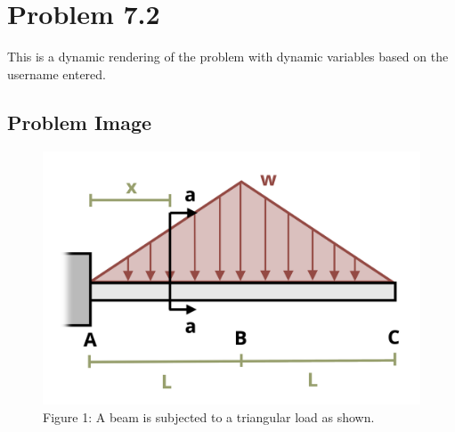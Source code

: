\documentclass[
  letterpaper,
  DIV=11,
  numbers=noendperiod]{scrreprt}
\begin{document}
\chapter*{Problem 7.2}\label{problem-7.2}


This is a dynamic rendering of the problem with dynamic variables based
on the username entered.

\section*{Problem Image}\label{problem-image-74}


\begin{figure}[H]

{\centering \includegraphics{images/306.png}

}

\caption{Figure 1: A beam is subjected to a triangular load as shown.}

\end{figure}%
\end{document}
